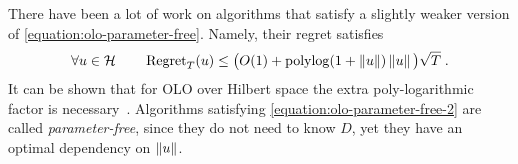 There have been a lot of work on algorithms \citep{Streeter-McMahan-2012,
Orabona-2013, McMahan-Abernethy-2013,
McMahan-Orabona-2014,Orabona-2014, Orabona-Pal-2016-parameter-free} that satisfy a slightly
weaker version of \eqref{equation:olo-parameter-free}. Namely, their regret satisfies
\begin{equation}
\label{equation:olo-parameter-free-2}
\forall u \in \mathcal{H} \qquad \operatorname{Regret}_T(u) \le \big(O(1)+\operatorname{polylog}(1 + \left\|{u}\right\|)\left\|{u}\right\| \big) \sqrt{T} \; .
\end{equation}
It can be shown that for \ac{OLO} over Hilbert space the extra poly-logarithmic
factor is necessary~\citep{McMahan-Abernethy-2013,Orabona-2013}. Algorithms
satisfying \eqref{equation:olo-parameter-free-2} are called
\emph{parameter-free}, since they do not need to know $D$, yet they have an
optimal dependency on $\left\|{u}\right\|$.
